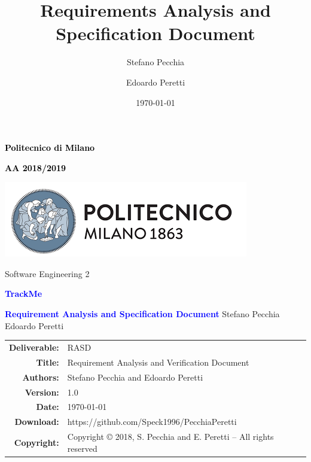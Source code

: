 \documentclass[a4paper,11pt]{report}
\title{Requirements Analysis and Specification Document}
\author{Stefano Pecchia \and Edoardo Peretti}
\date{\today}
\begin{document}
\begin{titlepage}
\centering

\textcolor{black}{\textbf{Politecnico di Milano}} \par
\textcolor{black}{\textbf{AA 2018/2019}} \par  \vspace{2em}
\includegraphics[scale=0.7]{resources/PolimiLogo}\par \vspace{1em}

Software Engineering 2 \par \vspace{1.5cm}
\textcolor{Blue}{\Large\textbf{TrackMe}} \par \vspace{3cm}

{\textcolor{Blue}{\textbf{\Huge{Requirement Analysis and Specification Document}}}} \vfill
Stefano Pecchia \hspace{5em} Edoardo Peretti \vspace{4cm}
\end{titlepage}



\begin{table}[h!]
\centering
\begin{tabular}{rl}
\hline
\textbf{Deliverable:} & RASD\\
\textbf{Title:} & Requirement Analysis and Verification Document \\
\textbf{Authors:} & Stefano Pecchia and Edoardo Peretti\\
\textbf{Version:} & 1.0 \\ 
\textbf{Date:} & \today \\
\textbf{Download:} & https://github.com/Speck1996/PecchiaPeretti \\
\textbf{Copyright:} & Copyright © 2018, S. Pecchia and E. Peretti – All rights reserved \\
\hline
\end{tabular}
\end{table}



\tableofcontents








\end{document}
